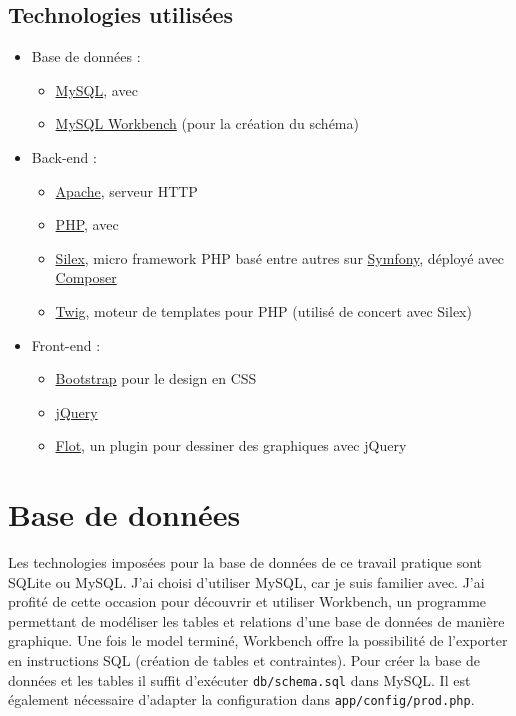 \documentclass[a4paper, 12pt]{article}
\begin{document}
\subsection{Technologies utilisées}
\begin{itemize}
	\item Base de données :
	\begin{itemize}
		\item \href{https://www.mysql.com/}{MySQL}, avec
		\item \href{https://www.mysql.com/products/workbench/}{MySQL Workbench} (pour la création du schéma)
	\end{itemize}
	\item Back-end :
	\begin{itemize}
		\item \href{https://httpd.apache.org/}{Apache}, serveur HTTP
		\item \href{http://php.net/}{PHP}, avec
		\item \href{https://silex.symfony.com/}{Silex}, micro framework PHP basé entre autres sur \href{https://symfony.com/}{Symfony}, déployé avec \href{https://getcomposer.org/}{Composer}
		\item \href{https://twig.symfony.com/}{Twig}, moteur de templates pour PHP (utilisé de concert avec Silex)
	\end{itemize}
	\item Front-end :
	\begin{itemize}
		\item \href{http://getbootstrap.com/}{Bootstrap} pour le design en CSS
		\item \href{https://jquery.org/}{jQuery}
		\item \href{http://www.flotcharts.org/}{Flot}, un plugin pour dessiner des graphiques avec jQuery
	\end{itemize}
\end{itemize}


\section{Base de données}
Les technologies imposées pour la base de données de ce travail pratique sont SQLite ou MySQL. J'ai choisi 
d'utiliser MySQL, car je suis familier avec. J'ai profité de cette occasion pour découvrir et utiliser Workbench, 
un programme permettant de modéliser les tables et relations d'une base de données de manière graphique. Une fois 
le model terminé, Workbench offre la possibilité de l'exporter en instructions SQL (création de tables et 
contraintes). Pour créer la base de données et les tables il suffit d'exécuter \texttt{db/schema.sql} 
dans MySQL. Il est également nécessaire d'adapter la configuration dans \texttt{app/config/prod.php}.
\bigbreak
\end{document}
